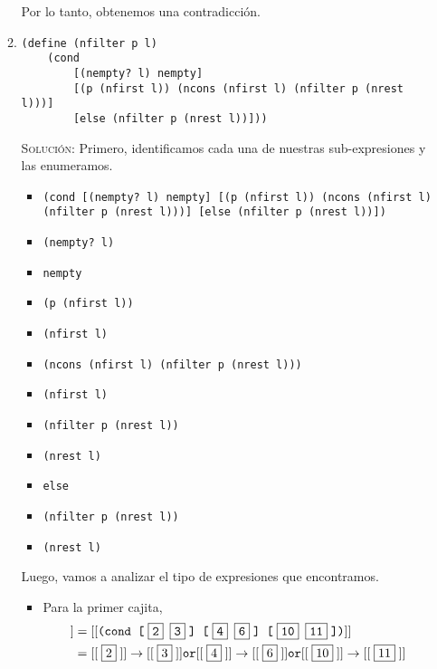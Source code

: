 \documentclass[letterpaper,11pt]{article}
\begin{document}
\begin{enumerate}
\begin{enumerate}
        Por lo tanto, obtenemos una contradicción.

        \item \begin{verbatim}(define (nfilter p l)
    (cond
        [(nempty? l) nempty]
        [(p (nfirst l)) (ncons (nfirst l) (nfilter p (nrest l)))]
        [else (nfilter p (nrest l))]))
        \end{verbatim}

        \textsc{Solución:} Primero, identificamos cada una de nuestras 
        sub-expresiones y las enumeramos.
        \begin{itemize}
            \item {} \texttt{(cond [(nempty? l) nempty] 
            [(p (nfirst l)) (ncons (nfirst l) (nfilter p (nrest l)))] 
            [else (nfilter p (nrest l))])}

            \item {} \texttt{(nempty? l)}

            \item {} \texttt{nempty}

            \item {} \texttt{(p (nfirst l))}

            \item {} \texttt{(nfirst l)}

            \item {} \texttt{(ncons (nfirst l) (nfilter p (nrest l)))}

            \item {} \texttt{(nfirst l)}

            \item {} \texttt{(nfilter p (nrest l))}

            \item {} \texttt{(nrest l)}

            \item {} \texttt{else}

            \item {} \texttt{(nfilter p (nrest l))}

            \item {} \texttt{(nrest l)}
        \end{itemize}

        Luego, vamos a analizar el tipo de expresiones que encontramos.
        \begin{itemize}
            \item Para la primer cajita, 
            \begin{align*}
                [[\;\fbox{1}\;]] 
                &= [[\texttt{(cond [\;\fbox{2} \fbox{3}\;] 
                [\;\fbox{4} \fbox{6}\;] [\;\fbox{10} \fbox{11}\;])}]] \\ 
                &= [[\;\fbox{2}\;]] \rightarrow [[\;\fbox{3}\;]] \texttt{or}
                [[\;\fbox{4}\;]] \rightarrow [[\;\fbox{6}\;]] \texttt{or}
                [[\;\fbox{10}\;]] \rightarrow [[\;\fbox{11}\;]]
            \end{align*}


\end{itemize}
\end{enumerate}
\end{enumerate}
\end{document}
